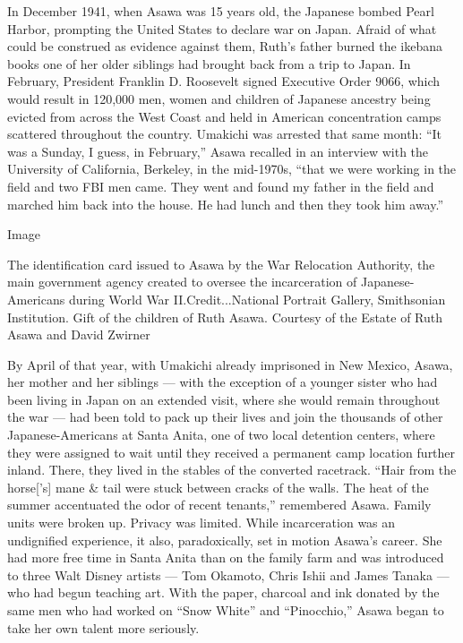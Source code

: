 In December 1941, when Asawa was 15 years old, the Japanese bombed Pearl
Harbor, prompting the United States to declare war on Japan. Afraid of
what could be construed as evidence against them, Ruth's father burned
the ikebana books one of her older siblings had brought back from a trip
to Japan. In February, President Franklin D. Roosevelt signed Executive
Order 9066, which would result in 120,000 men, women and children of
Japanese ancestry being evicted from across the West Coast and held in
American concentration camps scattered throughout the country. Umakichi
was arrested that same month: ``It was a Sunday, I guess, in February,''
Asawa recalled in an interview with the University of California,
Berkeley, in the mid-1970s, ``that we were working in the field and two
FBI men came. They went and found my father in the field and marched him
back into the house. He had lunch and then they took him away.''

Image

The identification card issued to Asawa by the War Relocation Authority,
the main government agency created to oversee the incarceration of
Japanese-Americans during World War II.Credit...National Portrait
Gallery, Smithsonian Institution. Gift of the children of Ruth Asawa.
Courtesy of the Estate of Ruth Asawa and David Zwirner

By April of that year, with Umakichi already imprisoned in New Mexico,
Asawa, her mother and her siblings --- with the exception of a younger
sister who had been living in Japan on an extended visit, where she
would remain throughout the war --- had been told to pack up their lives
and join the thousands of other Japanese-Americans at Santa Anita, one
of two local detention centers, where they were assigned to wait until
they received a permanent camp location further inland. There, they
lived in the stables of the converted racetrack. ``Hair from the
horse{[}'s{]} mane \& tail were stuck between cracks of the walls. The
heat of the summer accentuated the odor of recent tenants,'' remembered
Asawa. Family units were broken up. Privacy was limited. While
incarceration was an undignified experience, it also, paradoxically, set
in motion Asawa's career. She had more free time in Santa Anita than on
the family farm and was introduced to three Walt Disney artists --- Tom
Okamoto, Chris Ishii and James Tanaka --- who had begun teaching art.
With the paper, charcoal and ink donated by the same men who had worked
on ``Snow White'' and ``Pinocchio,'' Asawa began to take her own talent
more seriously.

